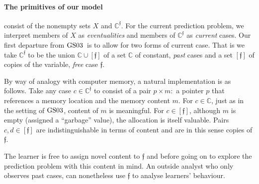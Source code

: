 \documentclass[12pt,a4paper,twoside]{article}
\newcommand{\gsii}{$\textup{GS03}$}
\newcommand{\novel}{\mathfrak f}
\newcommand{\mbbc}{{\mathds C}}
\newcommand{\mbbcp}{{\mathds C^{\novel}}}
\newcommand{\current}{{C^\star}}
\begin{document}
\paragraph{The primitives of our model}\hskip-5pt consist of the nonempty sets
$X$ and $\mbbcp$.  For the current prediction problem, we interpret members of
$X$ as \emph{eventualities} and members of $\mbbcp$ as \emph{current} cases.
Our first departure from \gsii\ is to allow for two forms of current case.
That is we take $\mbbcp $ to be the union $\mbbc \cup [\novel]$ of a set
$\mbbc$ of constant, \emph{past} cases and a set $[\novel]$ of copies of the
variable, \emph{free} case $\novel$.
\begin{remark*}

  By way of analogy with computer memory, a natural implementation is as
  follows.  Take any case $c \in \mbbcp$ to consist of a pair $p \times m:$ a
  pointer $p$ that references a memory location and the memory content $m$.
  For $c\in \mbbc$, just as in the setting of \gsii, content of $m$ is
  meaningful.  For $c \in [\novel]$, although $m$ is empty (assigned a
  ``garbage'' value), the allocation is itself valuable. Pairs $c, d\in
  [\novel]$ are indistinguishable in terms of content and are in this sense
  copies of $\novel$.

  The learner is free to assign novel content to $\novel$ and before going on
  to explore the prediction problem with this content in mind.  An outside
  analyst who only observes past cases, can nonetheless use $\novel$ to analyse
  learners' behaviour.
\end{remark*}

\end{document}
